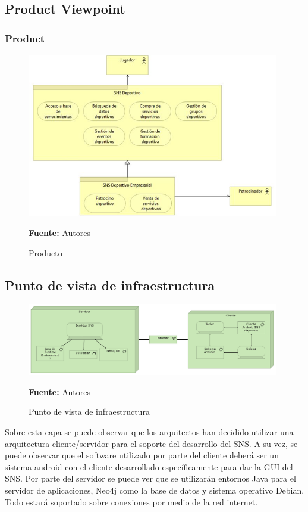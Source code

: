 \subsection{Product Viewpoint}

\subsubsection{Product}

\begin{figure}[!htb]
  \begin{center}
    \includegraphics[width=11cm]{./imagenes/Product.png}
    \caption{Producto}
    \label{fig:Product}
    \textbf{Fuente:}  Autores
  \end{center}
\end{figure}

\subsection{Punto de vista de infraestructura}

\begin{figure}[!htb]
  \begin{center}
    \includegraphics[width=11cm]{./imagenes/infrastructure.png}
    \caption{Punto de vista de infraestructura}
    \label{fig:infrastructure}
    \textbf{Fuente:}  Autores
  \end{center}
\end{figure}

Sobre esta capa se puede observar que los arquitectos han decidido utilizar una arquitectura cliente/servidor para el soporte del desarrollo del SNS. A su vez, se puede observar que el software utilizado por parte del cliente deberá ser un sistema android con el cliente desarrollado específicamente para dar la GUI del SNS. Por parte del servidor se puede ver que se utilizarán entornos Java para el servidor de aplicaciones, Neo4j como la base de datos y sistema operativo Debian. Todo estará soportado sobre conexiones por medio de la red internet.